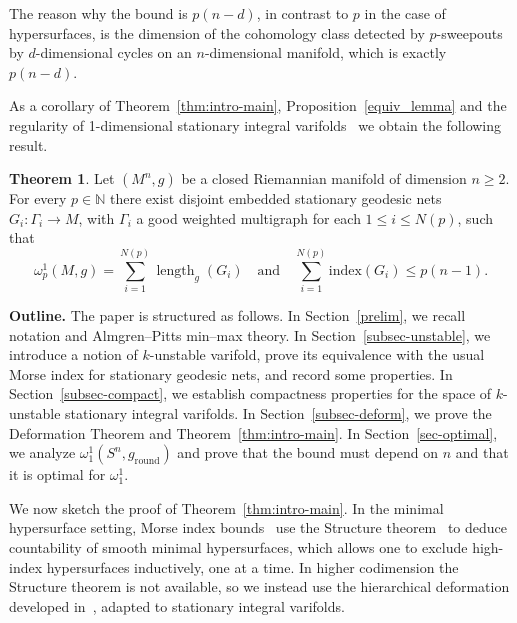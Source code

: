 \documentclass[12pt,english]{article}
\theoremstyle{definition}
\newtheorem{theorem}{Theorem}[section]
\begin{document}
The reason why the bound is $p(n-d)$, in contrast to $p$ in the case of hypersurfaces, is the dimension of the cohomology class detected by $p$-sweepouts by $d$-dimensional cycles on an $n$-dimensional manifold, which is exactly $p(n-d)$.

As a corollary of Theorem~\ref{thm:intro-main}, Proposition~\ref{equiv_lemma} and the regularity of 1-dimensional stationary integral varifolds~\cite{AllardAlmgren,A2,CaCa,LiokumovichStaffa,NR,Pi2,Pi1} we obtain the following result.

\begin{theorem}\label{thm:intro-nets}
Let $(M^{n},g)$ be a closed Riemannian manifold of dimension $n \geq 2$. For every $p\in\mathbb N$ there exist disjoint embedded stationary geodesic nets \(G_i:\Gamma_i\to M\), with $\Gamma_i$ a good weighted multigraph for each $1 \leq i \leq N(p)$, such that
\[
\omega_p^1(M,g)= \sum_{i=1}^{N(p)} \operatorname{length}_g(G_i)
\quad\text{and}\quad
\sum_{i=1}^{N(p)}\mathrm{index}(G_i)\le p(n-1).
\]
\end{theorem}




\textbf{Outline.}
The paper is structured as follows. In Section~\ref{prelim}, we recall notation and Almgren--Pitts min--max theory. In Section~\ref{subsec-unstable}, we introduce a notion of $k$-unstable varifold, prove its equivalence with the usual Morse index for stationary geodesic nets, and record some properties. In Section~\ref{subsec-compact}, we establish compactness properties for the space of $k$-unstable stationary integral varifolds. In Section~\ref{subsec-deform}, we prove the Deformation Theorem and Theorem~\ref{thm:intro-main}. In Section~\ref{sec-optimal}, we analyze $\omega^1_1(S^n,g_{\operatorname{round}})$ and prove that the bound must depend on $n$ and that it is optimal for $\omega_1^1$.

We now sketch the proof of Theorem~\ref{thm:intro-main}. In the minimal hypersurface setting, Morse index bounds~\cite{MarquesNeves} use the Structure theorem~\cite{abraham1970bumpy,white2017bumpy,white1991space} to deduce countability of smooth minimal hypersurfaces, which allows one to exclude high-index hypersurfaces inductively, one at a time. In higher codimension the Structure theorem is not available, so we instead use the hierarchical deformation developed in~\cite{yangyangli,song_hierarchical}, adapted to stationary integral varifolds.
\end{document}
